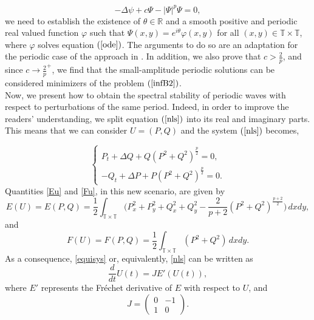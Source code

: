 \documentclass[12pt,reqno,a4paper]{amsart} %
\numberwithin{equation}{section}
\numberwithin{figure}{section}
\begin{document}
	\begin{equation}\label{complexode}
		-\Delta\psi+c\Psi-|\Psi|^p\Psi=0,
		\end{equation}
	we need to establish the existence of $\theta\in\mathbb{R}$ and a smooth positive and periodic real valued function $\varphi$ such that $\Psi(x,y)=e^{i\theta}\varphi(x,y)$ for all $(x,y)\in\mathbb{T}\times \mathbb{T}$, where $\varphi$ solves equation $(\ref{ode})$. The arguments to do so are an adaptation for the periodic case of the approach in \cite[Section 8]{Cazenave}. In addition, we also prove that $c > \frac{2}{p}$, and since $c \rightarrow \frac{2}{p}^{+}$, we find that the small-amplitude periodic solutions can be considered minimizers of the problem $(\ref{infB2})$.\\
		\indent Now, we present how to obtain the spectral stability of periodic waves with respect to perturbations of the same period. Indeed, in order to improve the readers' understanding, we split equation $(\ref{nls})$ into its real and imaginary parts. This means that we can consider $U = (P,Q)$ and the system $(\ref{nls})$ becomes,
		
			\begin{equation}\label{equisys}
			\left\{\begin{array}{cccc}
				P_t+\Delta Q+Q(P^2+Q^2)^{\frac{p}{2}}=0,\\
				-Q_t+\Delta P+P(P^2+Q^2)^{\frac{p}{2}}=0.
			\end{array}\right.
		\end{equation}
		Quantities \eqref{Eu} and \eqref{Fu}, in this new scenario, are given by
		\begin{equation}\label{hamiltocons1}
			E(U)=E(P,Q)=\frac{1}{2}\int_{\mathbb{T}\times\mathbb{T}} \bigg(P_x^2+P_y^2+Q_x^2+Q_y^2-\frac{2}{p+2}(P^2+Q^2)^{\frac{p+2}{2}}\bigg)\,dxdy,
		\end{equation}
		and
		\begin{equation}\label{mass1}
			F(U)=F(P,Q)=\frac{1}{2}\int_{\mathbb{T}\times\mathbb{T}} (P^2+Q^2)\,dxdy.
		\end{equation}
		As a consequence, \eqref{equisys} or, equivalently, \eqref{nls} can be written as
		\begin{equation}\label{hamiltonian}
			\frac{d}{dt}U(t)=J E'(U(t)),
		\end{equation}
		where $E'$ represents the Fr\'echet derivative of $E$ with respect to $U$, and
		\begin{equation}\label{J}
			J=\left(\begin{array}{cccc}
				0 & -1\\
				1 & 0
			\end{array}\right).
		\end{equation}
		
\end{document}

